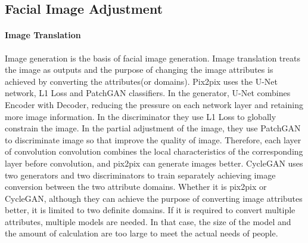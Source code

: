 \subsection{Facial Image Adjustment}

\paragraph{Image Translation}
Image generation is the basis of facial image generation.
Image translation treats the image as outputs and the purpose of changing the image attributes is achieved by converting the attributes(or domains).
Pix2pix uses the U-Net network, L1 Loss and PatchGAN classifiers.
In the generator, U-Net combines Encoder with Decoder,
    reducing the pressure on each network layer and retaining more image information.
In the discriminator they use L1 Loss to globally constrain the image.
In the partial adjustment of the image,
    they use PatchGAN to discriminate image so that improve the quality of image.
Therefore, each layer of convolution convolution combines the local characteristics of the corresponding layer before convolution,
    and pix2pix can generate images better.
CycleGAN uses two generators and two discriminators to train separately achieving image conversion between the two attribute domains.
Whether it is pix2pix or CycleGAN,
    although they can achieve the purpose of converting image attributes better,
    it is limited to two definite domains.
If it is required to convert multiple attributes, multiple models are needed.
In that case, the size of the model and the amount of calculation are too large to meet the actual needs of people.

